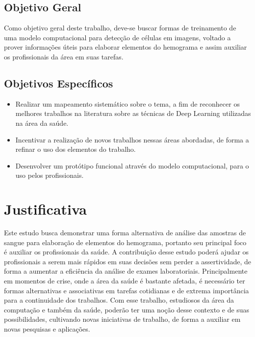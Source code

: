 \subsection{Objetivo Geral}
Como objetivo geral deste trabalho, deve-se buscar formas de treinamento de uma modelo computacional para detecção de células em imagens, voltado a prover informações úteis para elaborar elementos do hemograma e assim auxiliar os profissionais da área em suas tarefas.

\subsection{Objetivos Específicos}
\begin{itemize}
    \item Realizar um mapeamento sistemático sobre o tema, a fim de reconhecer os melhores trabalhos na literatura sobre as técnicas de Deep Learning utilizadas na área da saúde.
    \item Incentivar a realização de novos trabalhos nessas áreas abordadas, de forma a refinar o uso dos elementos do trabalho.
    \item Desenvolver um protótipo funcional através do modelo computacional, para o uso pelos profissionais.
\end{itemize}

\section{Justificativa}
\label{sec:justificativa}
Este estudo busca demonstrar uma forma alternativa de análise das amostras de sangue para elaboração de elementos do hemograma, portanto seu principal foco é auxiliar os profissionais da saúde. A contribuição desse estudo poderá ajudar os profissionais a serem mais rápidos em suas decisões sem perder a assertividade, de forma a aumentar a eficiência da análise de exames laboratoriais. Principalmente em momentos de crise, onde a área da saúde é bastante afetada, é necessário ter formas alternativas e associativas em tarefas cotidianas e de extrema importância para a continuidade dos trabalhos. Com esse trabalho, estudiosos da área da computação e também da saúde, poderão ter uma noção desse contexto e de suas possibilidades, cultivando novas iniciativas de trabalho, de forma a auxiliar em novas pesquisas e aplicações.

